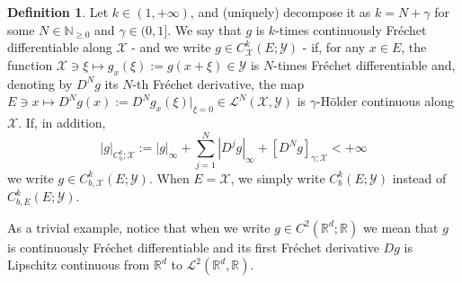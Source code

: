 \documentclass[10pt, a4paper]{article} %
\newcommand{\R}{\mathbb{R}}
\theoremstyle{definition}
\newtheorem{defn}{Definition}[section]
\theoremstyle{plain}
\begin{document}
\begin{defn}
    Let $k \in (1,+\infty)$, and (uniquely) decompose it as $k = N + \gamma$ for some $N \in \mathbb{N}_{\ge 0}$ and $\gamma \in (0,1]$. We say that $g$ is $k$-times continuously Fréchet differentiable along $\mathcal{X}$ - and we write $g \in C^k_\mathcal{X}(E;\mathcal{Y})$ - if, for any $x \in E$, the function $\mathcal{X} \ni \xi \mapsto g_x(\xi) := g(x+\xi) \in \mathcal{Y}$ is $N$-times Fréchet differentiable and, denoting by $D^N g$ its $N$-th Fréchet derivative, the map $E \ni x \mapsto D^N g (x) := D^N g_x (\xi) |_{\xi = 0} \in \mathscr{L}^N(\mathcal{X},\mathcal{Y})$ is $\gamma$-H\"older continuous along $\mathcal{X}$.  
    If, in addition, \begin{equation*}
        |g|_{C^k_b;\mathcal{X}} := |g|_\infty + \sum_{j=1}^N |D^j g|_\infty + [D^N g]_{\gamma;\mathcal{X}} < +\infty
    \end{equation*}
    we write $g \in C^k_{b,\mathcal{X}}(E;\mathcal{Y})$. When $E=\mathcal{X}$, we simply write $C^k_b(E;\mathcal{Y})$ instead of $C^k_{b,E}(E;\mathcal{Y})$. 
\end{defn}

\noindent As a trivial example, notice that when we write $g \in C^2(\R^d;\R)$ we mean that $g$ is continuously Fréchet differentiable and its first Fréchet derivative $Dg$ is Lipschitz continuous from $\R^d$ to $\mathscr{L}^2(\R^d,\R)$. 
\end{document}
